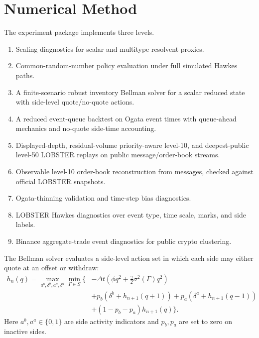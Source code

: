\documentclass[review]{siamonline250211}
\begin{document}
\section{Numerical Method}

The experiment package implements three levels.

\begin{enumerate}[nosep]
\item Scaling diagnostics for scalar and multitype resolvent proxies.
\item Common-random-number policy evaluation under full simulated Hawkes paths.
\item A finite-scenario robust inventory Bellman solver for a scalar reduced
state with side-level quote/no-quote actions.
\item A reduced event-queue backtest on Ogata event times with queue-ahead
mechanics and no-quote side-time accounting.
\item Displayed-depth, residual-volume priority-aware level-10, and
deepest-public level-50 LOBSTER replays on public message/order-book streams.
\item Observable level-10 order-book reconstruction from messages, checked
against official LOBSTER snapshots.
\item Ogata-thinning validation and time-step bias diagnostics.
\item LOBSTER Hawkes diagnostics over event type, time scale, marks, and side
labels.
\item Binance aggregate-trade event diagnostics for public crypto clustering.
\end{enumerate}

The Bellman solver evaluates a side-level action set in which each side may
either quote at an offset or withdraw:
\begin{align*}
h_n(q)=\max_{a^b,\delta^b,a^a,\delta^a}\min_{\Gamma\in S}\Big\{&
-\Delta t\left(\phi q^2+\frac{\gamma}{2}\sigma^2(\Gamma)q^2\right)\\
&+p_b(\delta^b+h_{n+1}(q+1))
+p_a(\delta^a+h_{n+1}(q-1))\\
&+(1-p_b-p_a)h_{n+1}(q)\Big\}.
\end{align*}
Here $a^b,a^a\in\{0,1\}$ are side activity indicators and $p_b,p_a$ are set to
zero on inactive sides.
\end{document}
